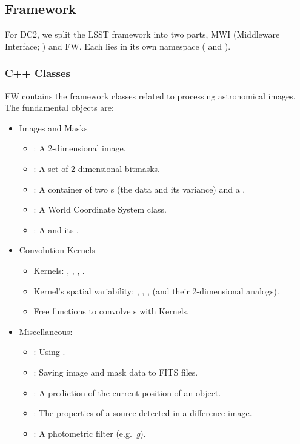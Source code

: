 
\subsection{Framework}
\label{FW}

For DC2, we split the LSST framework into two
parts, MWI (Middleware Interface; ) and FW.
Each lies in its own namespace ( and ).

\subsubsection{C++ Classes}

FW contains the framework classes related to processing astronomical images.
The fundamental objects are:
\begin{itemize}
\item Images and Masks
  \begin{itemize}
  \item {}:
    A 2-dimensional image.
  \item {}:
    A set of 2-dimensional bitmasks.
  \item {}:
    A container of two s (the data and its variance) and a .
  \item {}:
    A World Coordinate System class.
  \item {}:
    A  and its .
  \end{itemize}

  \item Convolution Kernels
    \begin{itemize}
      \item Kernels: , , , .
      \item Kernel's spatial variability: , , ,
	 (and their 2-dimensional analogs).
      \item Free functions to convolve s with Kernels.
    \end{itemize}

  \item Miscellaneous:
    \begin{itemize}
    \item {}:
      Using .
    \item{}:
      Saving image and mask data to FITS files.
    \item {}:
      A prediction of the current position of an object.
    \item {}:
      The properties of a source detected in a difference image.
    \item {}:
      A photometric filter (e.g.~\textit{g}).
    \end{itemize}
\end{itemize}

